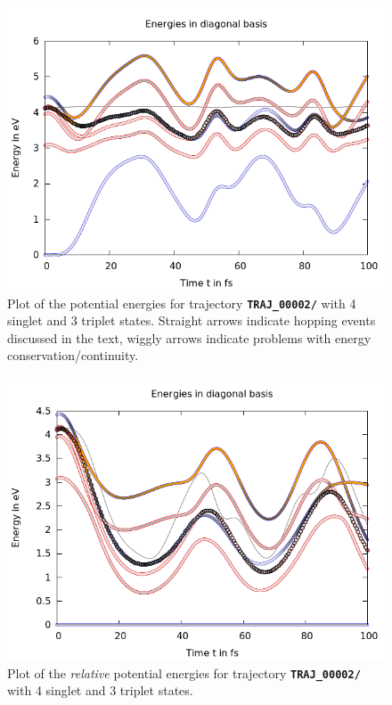 \documentclass[a4paper,11pt,DIV=15,openany]{scrbook}
\newcommand{\ttt}[1]{\textbf{\texttt{#1}}}
\begin{document}
\begin{figure}[tb]
  \centering
  \includegraphics[width=\textwidth]{figures/energy.png}
  \caption{Plot of the potential energies for trajectory \ttt{TRAJ\_00002/} with 4 singlet and 3 triplet states. Straight arrows indicate hopping events discussed in the text, wiggly arrows indicate problems with energy conservation/continuity. }
  \label{fig:en}
\end{figure}
\begin{figure}[tb]
  \centering
  \includegraphics[width=\textwidth]{figures/energy_rel.png}
  \caption{Plot of the \emph{relative} potential energies for trajectory \ttt{TRAJ\_00002/} with 4 singlet and 3 triplet states.  }
  \label{fig:en_rel}
\end{figure}
\end{document}
